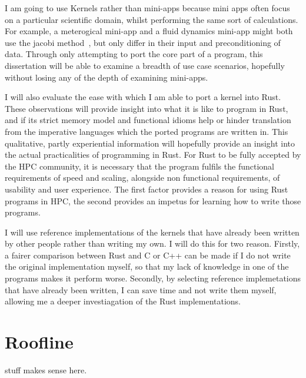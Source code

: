I am going to use Kernels rather than mini-apps because mini apps often focus on a particular scientific domain, whilst performing the same sort of calculations. For example, a meterogical mini-app and a fluid dynamics mini-app might both use the jacobi method~\cite{muller2014, schippers1982}, but only differ in their input and preconditioning of data.
Through only attempting to port the core part of a program, this dissertation will be able to examine a breadth of use case scenarios, hopefully without losing any of the depth of examining mini-apps.

I will also evaluate the ease with which I am able to port a kernel into Rust. These observations will provide insight into what it is like to program in Rust, and if its strict memory model and functional idioms help or hinder translation from the imperative languages which the ported programs are written in. This qualitative, partly experiential information will hopefully provide an insight into the actual practicalities of programming in Rust. For Rust to be fully accepted by the HPC community, it is necessary that the program fulfils the functional requirements of speed and scaling, alongside non functional requirements, of usability and user experience. The first factor provides a reason for using Rust programs in HPC, the second provides an impetus for learning how to write those programs.

I will use reference implementations of the kernels that have already been written by other people rather than writing my own. I will do this for two reason. Firstly, a fairer comparison between Rust and C or C++ can be made if I do not write the original implementation myself, so that my lack of knowledge in one of the programs makes it perform worse. Secondly, by selecting reference implemetations that have already been written, I can save time and not write them myself, allowing me a deeper investiagation of the Rust implementations.
\section{Roofline} stuff makes sense here.
